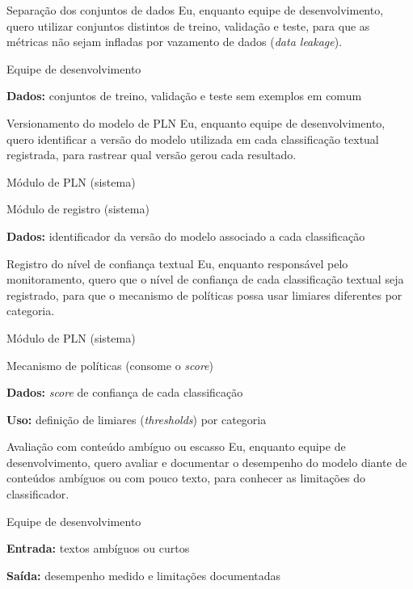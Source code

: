 \documentclass[
    12pt,           %
    oneside,        %
    a4paper,        %
    chapter=TITLE,  %
    english,        %
    brazil          %
]{abntex2}
\begin{document}
{Separação dos conjuntos de dados}
{Eu, enquanto equipe de desenvolvimento, quero utilizar conjuntos distintos de treino, validação e teste, para que as métricas não sejam infladas por vazamento de dados (\textit{data leakage}).}
{\begin{dadoslista}
\item Equipe de desenvolvimento
\end{dadoslista}}
{\begin{dadoslista}
\item \textbf{Dados:} conjuntos de treino, validação e teste sem exemplos em comum
\end{dadoslista}}

{Versionamento do modelo de PLN}
{Eu, enquanto equipe de desenvolvimento, quero identificar a versão do modelo utilizada em cada classificação textual registrada, para rastrear qual versão gerou cada resultado.}
{\begin{dadoslista}
\item Módulo de PLN (sistema)
\item Módulo de registro (sistema)
\end{dadoslista}}
{\begin{dadoslista}
\item \textbf{Dados:} identificador da versão do modelo associado a cada classificação
\end{dadoslista}}

{Registro do nível de confiança textual}
{Eu, enquanto responsável pelo monitoramento, quero que o nível de confiança de cada classificação textual seja registrado, para que o mecanismo de políticas possa usar limiares diferentes por categoria.}
{\begin{dadoslista}
\item Módulo de PLN (sistema)
\item Mecanismo de políticas (consome o \textit{score})
\end{dadoslista}}
{\begin{dadoslista}
\item \textbf{Dados:} \textit{score} de confiança de cada classificação
\item \textbf{Uso:} definição de limiares (\textit{thresholds}) por categoria
\end{dadoslista}}

{Avaliação com conteúdo ambíguo ou escasso}
{Eu, enquanto equipe de desenvolvimento, quero avaliar e documentar o desempenho do modelo diante de conteúdos ambíguos ou com pouco texto, para conhecer as limitações do classificador.}
{\begin{dadoslista}
\item Equipe de desenvolvimento
\end{dadoslista}}
{\begin{dadoslista}
\item \textbf{Entrada:} textos ambíguos ou curtos
\item \textbf{Saída:} desempenho medido e limitações documentadas
\end{dadoslista}}
\end{document}

